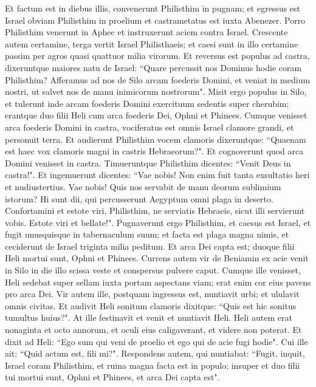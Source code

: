 \begin{biblechapter}  
\verse Et factum est in diebus illis, convenerunt Philisthim in pugnam; et egressus est Israel obviam Philisthim in proelium et castrametatus est iuxta Abenezer. Porro Philisthim venerunt in Aphec 
\verse et instruxerunt aciem contra Israel. Crescente autem certamine, terga vertit Israel Philisthaeis; et caesi sunt in illo certamine passim per agros quasi quattuor milia virorum. 
\verse Et reversus est populus ad castra, dixeruntque maiores natu de Israel: “Quare percussit nos Dominus hodie coram Philisthim? Afferamus ad nos de Silo arcam foederis Domini, et veniat in medium nostri, ut salvet nos de manu inimicorum nostrorum". 
\verse Misit ergo populus in Silo, et tulerunt inde arcam foederis Domini exercituum sedentis super cherubim; erantque duo filii Heli cum arca foederis Dei, Ophni et Phinees. 
\verse Cumque venisset arca foederis Domini in castra, vociferatus est omnis Israel clamore grandi, et personuit terra. 
\verse Et audierunt Philisthim vocem clamoris dixeruntque: “Quaenam est haec vox clamoris magni in castris Hebraeorum?". Et cognoverunt quod arca Domini venisset in castra. 
\verse Timueruntque Philisthim dicentes: “Venit Deus in castra!". Et ingemuerunt dicentes: 
\verse “Vae nobis! Non enim fuit tanta exsultatio heri et nudiustertius. Vae nobis! Quis nos servabit de manu deorum sublimium istorum? Hi sunt dii, qui percusserunt Aegyptum omni plaga in deserto. 
\verse Confortamini et estote viri, Philisthim, ne serviatis Hebraeis, sicut illi servierunt vobis. Estote viri et bellate!". 
\verse Pugnaverunt ergo Philisthim, et caesus est Israel, et fugit unusquisque in tabernaculum suum; et facta est plaga magna nimis, et ceciderunt de Israel triginta milia peditum. 
\verse Et arca Dei capta est; duoque filii Heli mortui sunt, Ophni et Phinees. 
\verse Currens autem vir de Beniamin ex acie venit in Silo in die illo scissa veste et conspersus pulvere caput. 
\verse Cumque ille venisset, Heli sedebat super sellam iuxta portam aspectans viam; erat enim cor eius pavens pro arca Dei. Vir autem ille, postquam ingressus est, nuntiavit urbi; et ululavit omnis civitas.  
\verse Et audivit Heli sonitum clamoris dixitque: “Quis est hic sonitus tumultus huius?". At ille festinavit et venit et nuntiavit Heli. 
\verse Heli autem erat nonaginta et octo annorum, et oculi eius caligaverant, et videre non poterat.  
\verse Et dixit ad Heli: “Ego sum qui veni de proelio et ego qui de acie fugi hodie". Cui ille ait: “Quid actum est, fili mi?". 
\verse Respondens autem, qui nuntiabat: “Fugit, inquit, Israel coram Philisthim, et ruina magna facta est in populo; insuper et duo filii tui mortui sunt, Ophni et Phinees, et arca Dei capta est". 

\end{biblechapter}
